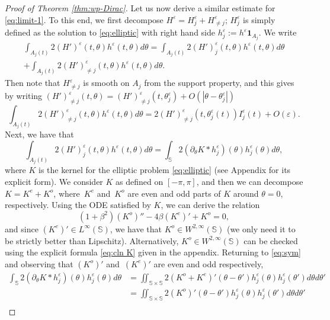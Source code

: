 \documentclass[10pt]{amsart}
\theoremstyle{plain}
\theoremstyle{definition}
\let\rd\partial
\let\bt\beta
\let\tht\theta
\let\varep\varepsilon
\newcommand{\bbS}{\mathbb S}
\begin{document}
\begin{proof}[Proof of Theorem \ref{thm:wp-Dirac}]
Let us now derive a similar estimate for \eqref{eq:limit-1}. To this end, we first decompose $H^\varep = H^\varep_j + H^\varep_{\ne j}$; $H^{\varep}_j$ is simply defined as the solution to \eqref{eq:elliptic} with right hand side $h^\varep_j := h^\varep \mathbf{1}_{A_{j}}$. We write
\begin{multline*}
\int_{A_{j}(t)} 2 (H')^\varep(t,\tht) h^\varep(t,\tht) d\tht = \int_{A_{j}(t)} 2 (H')^\varep_{j}(t,\tht) h^\varep(t,\tht) d\tht\\
+\int_{A_{j}(t)} 2 (H')^\varep_{\ne j}(t,\tht) h^\varep(t,\tht) d\tht.
\end{multline*}
Then note that $H^\varep_{\ne j}$ is smooth on $A_{j}$ from the support property, and this gives by writing $(H')^\varep_{\ne j}(t,\tht) = (H')^\varep_{\ne j}(t,\tht_j^\varep) + O(|\tht - \tht_j^\varep|)$
\begin{equation*}
\int_{A_{j}(t)} 2 (H')^\varep_{\ne j}(t,\tht) h^\varep(t,\tht) d\tht = 2 (H')^\varep_{\ne j}(t,\tht^\varep_j(t)) I^{\varep}_j(t) + O(\varep).
\end{equation*}
Next, we have that
\begin{equation}\label{eq:sym}
\int_{A_{j}(t)} 2 (H')^\varep_{j}(t,\tht) h^\varep(t,\tht) d\tht = \int_{\bbS} 2 (\rd_\tht K*h^\varep_j) (\tht) h^\varep_j(\tht) d\tht,
\end{equation}
where $K$ is the kernel for the elliptic problem \eqref{eq:elliptic} (see Appendix for its explicit form). We consider $K$ as defined on $[-\pi,\pi]$, and then we can decompose $K= K^e + K^o$, where~$K^e$ and~$K^o$ are even and odd parts of $K$ around $\tht = 0$, respectively. Using the ODE satisfied by $K$, we can derive the relation
\begin{equation*}
(1+\bt^2) (K^o)'' - 4\bt (K^e)' + K^o = 0,
\end{equation*}
and since $(K^e)' \in L^\infty(\bbS)$, we have that $K^o \in W^{2,\infty}(\bbS)$ (we only need it to be strictly better than Lipschitz). Alternatively, $K^o \in W^{2,\infty}(\bbS)$ can be checked using the explicit formula \eqref{eq:cln K} given in the appendix. Returning to \eqref{eq:sym} and observing that $(K^o)'$ and~$(K^e)'$ are even and odd respectively,
\begin{equation*}
\begin{split}
\int_{\bbS} 2 (\rd_\tht K*h^\varep_j) (\tht) h^\varep_j(\tht) d\tht & = \iint_{\bbS\times\bbS} 2 (K^o + K^e)'(\tht-\tht') h^\varep_j (\tht) h^\varep_j (\tht') d\tht d\tht' \\
& = \iint_{\bbS\times\bbS} 2 (K^o)'(\tht-\tht') h^\varep_j (\tht) h^\varep_j (\tht') d\tht d\tht' \\

\end{split}
\end{equation*}
\end{proof}
\end{document}
